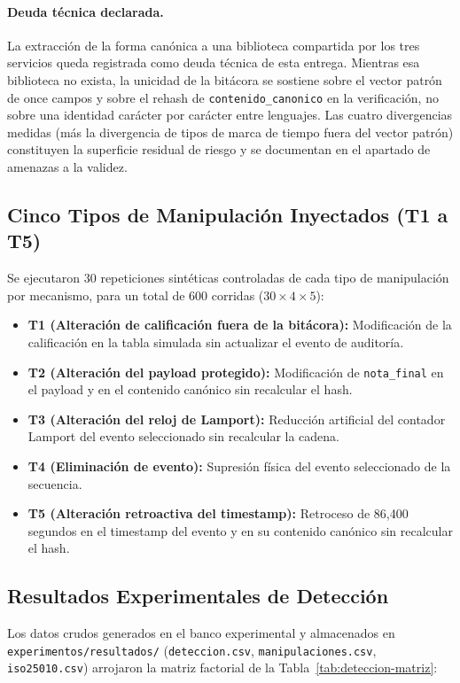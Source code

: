 \documentclass[11pt,a4paper]{article}
\begin{document}
\paragraph{Deuda t\'ecnica declarada.}
La extracci\'on de la forma can\'onica a una biblioteca compartida por
los tres servicios queda registrada como deuda t\'ecnica de esta entrega.
Mientras esa biblioteca no exista, la unicidad de la bit\'acora se
sostiene sobre el vector patr\'on de once campos y sobre el rehash de
\texttt{contenido\_canonico} en la verificaci\'on, no sobre una identidad
car\'acter por car\'acter entre lenguajes. Las cuatro divergencias
medidas (m\'as la divergencia de tipos de marca de tiempo fuera del
vector patr\'on) constituyen la superficie residual de riesgo y se
documentan en el apartado de amenazas a la validez.

\subsection{Cinco Tipos de Manipulaci\'on Inyectados (T1 a T5)}
Se ejecutaron 30 repeticiones sint\'eticas controladas de cada tipo de manipulaci\'on por mecanismo, para un total de 600 corridas ($30 \times 4 \times 5$):
\begin{itemize}
  \item \textbf{T1 (Alteraci\'on de calificaci\'on fuera de la bit\'acora):} Modificaci\'on de la calificaci\'on en la tabla simulada sin actualizar el evento de auditor\'ia.
  \item \textbf{T2 (Alteraci\'on del payload protegido):} Modificaci\'on de \texttt{nota\_final} en el payload y en el contenido can\'onico sin recalcular el hash.
  \item \textbf{T3 (Alteraci\'on del reloj de Lamport):} Reducci\'on artificial del contador Lamport del evento seleccionado sin recalcular la cadena.
  \item \textbf{T4 (Eliminaci\'on de evento):} Supresi\'on f\'isica del evento seleccionado de la secuencia.
  \item \textbf{T5 (Alteraci\'on retroactiva del timestamp):} Retroceso de 86{,}400 segundos en el timestamp del evento y en su contenido can\'onico sin recalcular el hash.
\end{itemize}

\subsection{Resultados Experimentales de Detecci\'on}
\label{subsec:resultados-deteccion}
Los datos crudos generados en el banco experimental y almacenados en \texttt{experimentos/resultados/} (\texttt{deteccion.csv}, \texttt{manipulaciones.csv}, \texttt{iso25010.csv}) arrojaron la matriz factorial de la Tabla~\ref{tab:deteccion-matriz}:
\end{document}
